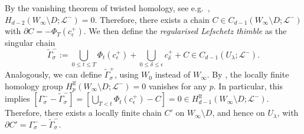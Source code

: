 \documentclass[11pt, a4paper]{article}
\numberwithin{theorem}{section}
\theoremstyle{remark}
\renewcommand{\L}{\mathcal{L}}
\newcommand{\lf}{\mathrm{lf}}
\theoremstyle{theorem}
\begin{document}
By the vanishing theorem of twisted homology, see e.g.\ \cite[Theorem A.1]{agostini2022vector}, $H_{d-2}(W_\infty \setminus D; \L^-) = 0$. Therefore, there exists a chain $C\in C_{d-1}(W_\infty\setminus D;\L^-)$ with $\partial C = -\Phi_T(c_\epsilon^+)$. We then define the \emph{regularised Lefschetz thimble} as the singular chain
\[
  \widetilde{\Gamma}^{-}_\sigma := \bigcup_{0\leq t\leq T} \Phi_t(c_\epsilon^+) + \bigcup_{0 \leq \delta\leq \epsilon} c^+_\delta + C \in C_{d-1}(U_\lambda;\L^-).
\]
Analogously, we can define $\widetilde{\Gamma}^{+}_\sigma$, using $W_0$ instead of $W_\infty$. By \cite[Lemma 4.2]{matsubara2023localization}, the locally finite homology group $H_p^{\lf}(W_\infty \setminus D; \L^-) = 0$ vanishes for any $p$. In particular, this implies $[\Gamma^-_\sigma - \widetilde{\Gamma}^-_\sigma] = [\bigcup_{T < t} \Phi_t(c_\epsilon^+) - C] = 0 \in H_{d-1}^{\lf}(W_\infty \setminus D; \L^-)$. Therefore, there exists a locally finite chain $C'$ on $W_\infty \setminus D$, and hence on $U_\lambda$, with $\partial C' = \Gamma^-_\sigma - \widetilde{\Gamma}^-_\sigma$. \par
\end{document}
